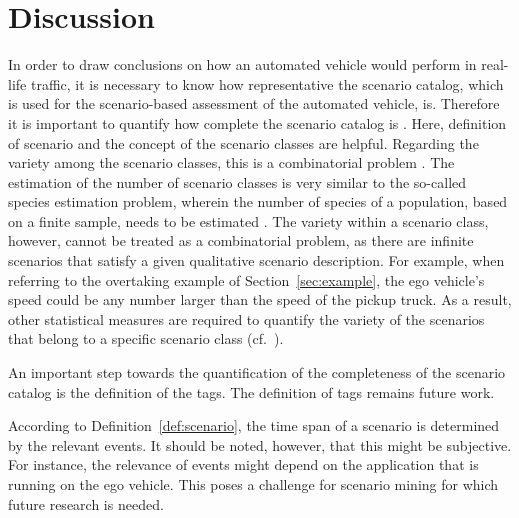 \section{Discussion}
\label{sec:discussion}

In order to draw conclusions on how an automated vehicle would perform in real-life traffic, it is necessary to know how representative the scenario catalog, which is used for the scenario-based assessment of the automated vehicle, is. Therefore it is important to quantify how complete the scenario catalog is \cite{geyer2014, alvarez2017prospective, stellet2015taxonomy}. Here, definition of scenario and the concept of the scenario classes are helpful. Regarding the variety among the scenario classes, this is a combinatorial problem \cite{geyer2014}. The estimation of the number of scenario classes is very similar to the so-called species estimation problem, wherein the number of species of a population, based on a finite sample, needs to be estimated \cite{yang2012estimating, bunge1993estimating}. The variety within a scenario class, however, cannot be treated as a combinatorial problem, as there are infinite scenarios that satisfy a given qualitative scenario description. For example, when referring to the overtaking example of Section~\ref{sec:example}, the ego vehicle's speed could be any number larger than the speed of the pickup truck. As a result, other statistical measures are required to quantify the variety of the scenarios that belong to a specific scenario class (cf.~\cite{wang2017much}).

An important step towards the quantification of the completeness of the scenario catalog is the definition of the tags. The definition of tags remains future work.

According to Definition~\ref{def:scenario}, the time span of a scenario is determined by the relevant events. It should be noted, however, that this might be subjective. For instance, the relevance of events might depend on the application that is running on the ego vehicle. This poses a challenge for scenario mining for which future research is needed.
